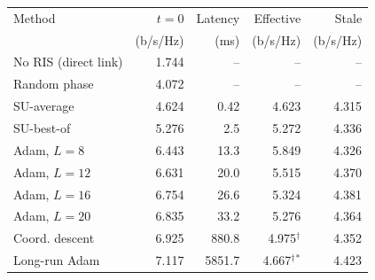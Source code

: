 \begin{tabular}{lrrrr}
\toprule
Method & $t{=}0$ & Latency & Effective & Stale \\
 & (b/s/Hz) & (ms) & (b/s/Hz) & (b/s/Hz) \\
\midrule
No RIS (direct link) & 1.744 & -- & -- & -- \\
Random phase & 4.072 & -- & -- & -- \\
SU-average & 4.624 & 0.42 & 4.623 & 4.315 \\
SU-best-of & 5.276 & 2.5 & 5.272 & 4.336 \\
Adam, $L=8$ & 6.443 & 13.3 & 5.849 & 4.326 \\
Adam, $L=12$ & 6.631 & 20.0 & 5.515 & 4.370 \\
Adam, $L=16$ & 6.754 & 26.6 & 5.324 & 4.381 \\
Adam, $L=20$ & 6.835 & 33.2 & 5.276 & 4.364 \\
Coord. descent & 6.925 & 880.8 & 4.975$^\dagger$ & 4.352 \\
Long-run Adam & 7.117 & 5851.7 & 4.667$^\dagger$$^\ast$ & 4.423 \\
\bottomrule
\end{tabular}
